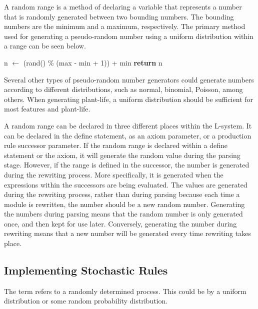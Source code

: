 A random range is a method of declaring a variable that represents a number that is randomly generated between two bounding numbers. The bounding numbers are the minimum and a maximum, respectively. The primary method used for generating a pseudo-random number using a uniform distribution within a range can be seen below. 

\begin{singlespace}
\begin{algorithm}
\begin{algorithmic}[1]
	\State n $\gets$ (rand() \% (max - min + 1)) + min
	\State \textbf{return} n
\EndProcedure
\end{algorithmic}
\end{algorithm}
\end{singlespace}

\newpage
Several other types of pseudo-random number generators could generate numbers according to different distributions, such as normal, binomial, Poisson, among others. When generating plant-life, a uniform distribution should be sufficient for most features and plant-life.

A random range can be declared in three different places within the L-system. It can be declared in the define statement, as an axiom parameter, or a production rule successor parameter. If the random range is declared within a define statement or the axiom, it will generate the random value during the parsing stage. However, if the range is defined in the successor, the number is generated during the rewriting process. More specifically, it is generated when the expressions within the successors are being evaluated. The values are generated during the rewriting process, rather than during parsing because each time a module is rewritten, the number should be a new random number. Generating the numbers during parsing means that the random number is only generated once, and then kept for use later. Conversely, generating the number during rewriting means that a new number will be generated every time rewriting takes place. 

\subsection{Implementing Stochastic Rules} \label{stochastic rules}

The term  refers to a randomly determined process. This could be by a uniform distribution or some random probability distribution. 

